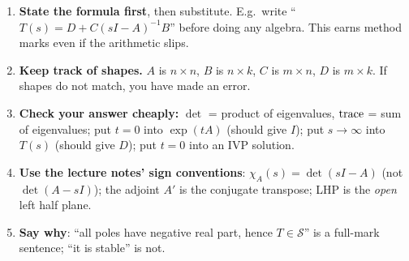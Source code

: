 \begin{exambox}[title={Exam technique for this module}]
\begin{enumerate}
\item \textbf{State the formula first}, then substitute. E.g.\ write ``$T(s)=D+C(sI-A)^{-1}B$'' before doing any algebra. This earns method marks even if the arithmetic slips.
\item \textbf{Keep track of shapes.} $A$ is $n\times n$, $B$ is $n\times k$, $C$ is $m\times n$, $D$ is $m\times k$. If shapes do not match, you have made an error.
\item \textbf{Check your answer cheaply:} $\det$ = product of eigenvalues, $\operatorname{trace}$ = sum of eigenvalues; put $t=0$ into $\exp(tA)$ (should give $I$); put $s\to\infty$ into $T(s)$ (should give $D$); put $t=0$ into an IVP solution.
\item \textbf{Use the lecture notes' sign conventions}: $\chi_A(s)=\det(sI-A)$ (not $\det(A-sI)$); the adjoint $A'$ is the conjugate transpose; LHP is the \emph{open} left half plane.
\item \textbf{Say why}: ``all poles have negative real part, hence $T\in\mathcal S$'' is a full-mark sentence; ``it is stable'' is not.
\end{enumerate}
\end{exambox}
\newpage
